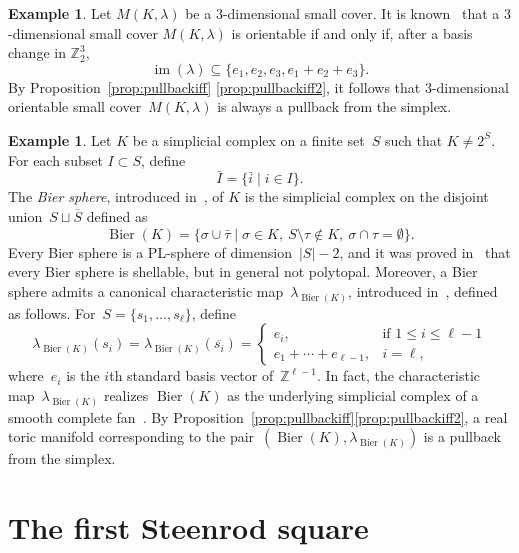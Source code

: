 \documentclass{amsart}
\newcommand{\Z}{\mathbb{Z}}
\DeclareMathOperator{\im}{im}
\DeclareMathOperator{\Bier}{Bier}
\theoremstyle{plain}
\numberwithin{equation}{section}
\theoremstyle{definition}
\newtheorem{example}[theorem]{Example}
\theoremstyle{remark}
\begin{document}
\begin{example}\label{ex:Subsec3dim} 
    Let $M(K,\lambda)$ be a $3$-dimensional small cover.
    It is known~\cite{Nakayama-Nishimura2005} that a $3$-dimensional small cover $M(K,\lambda)$ is orientable if and only if,
    after a basis change in $\Z_2^3$,
    $$
        \im(\lambda) \subseteq \{e_1,e_2,e_3,e_1+e_2+e_3\}.
    $$
    By Proposition~\ref{prop:pullbackiff} \eqref{prop:pullbackiff2}, it follows that $3$-dimensional orientable small cover~$M(K,\lambda)$ is always a pullback from the simplex.  
\end{example}

\begin{example}\label{ex:SubsecBier} 
    Let $K$ be a simplicial complex on a finite set~$S$ such that $K\neq 2^S$.
    For each subset $I\subset S$, define
    $$
        \bar I=\{\bar i\mid i\in I\}.
    $$
    The \emph{Bier sphere}, introduced in~\cite{Bier1992}, of $K$ is the simplicial complex on the disjoint union~$S\sqcup\overline{S}$ defined as
    $$
        \Bier(K)=\{\sigma\cup\bar{\tau}\mid \sigma\in K,\ S \setminus \tau \notin K,\ \sigma\cap\tau=\emptyset\}.
    $$
    Every Bier sphere is a PL-sphere of dimension~$|S|-2$, and it was proved in~\cite{Bjorner-Paffenholz-Sjostrand-Ziegler2005} that every Bier sphere is shellable, but in general not polytopal.
    Moreover, a Bier sphere admits a canonical characteristic map~$\lambda_{\Bier(K)}$, introduced in~\cite{Ivan_Sergeev2024}, defined as follows.
    For~$S = \{s_1,\ldots,s_{\ell}\}$, define
    $$
        \lambda_{\Bier(K)}(s_i) = \lambda_{\Bier(K)}(\overline{s_i})=
        \begin{cases}
            e_i, & \mbox{if } 1 \leq i \leq \ell-1 \\
            e_1+ \cdots + e_{\ell-1}, & i = \ell,
        \end{cases}
    $$
    where~$e_i$ is the $i$th standard basis vector of~$\Z^{\ell-1}$.
    In fact, the characteristic map~$\lambda_{\Bier(K)}$ realizes $\Bier(K)$ as the underlying simplicial complex of a smooth complete fan~\cite{Ivan-Marinko-Rade2025}.
    By Proposition~\ref{prop:pullbackiff}\eqref{prop:pullbackiff2}, a real toric manifold corresponding to the pair~$(\Bier(K),\lambda_{\Bier(K)})$ is a pullback from the simplex.
\end{example}


\section{The first Steenrod square}\label{sec:Steenrod}
\end{document}
